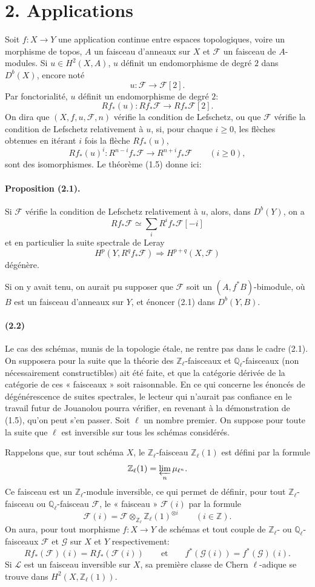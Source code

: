\documentclass[10pt]{article}
\newcommand{\Fcal}{\mathcal F}
\newcommand{\Gcal}{\mathcal G}
\newcommand{\Z}{\mathbb Z}
\newcommand{\Q}{\mathbb Q}
\begin{document}
\section*{2. Applications}

Soit $f:X\to Y$ une application continue entre espaces topologiques, voire un morphisme de topos, $A$ un faisceau d'anneaux sur $X$ et $\Fcal$ un faisceau de $A$-modules. Si $u\in H^2(X,A)$, $u$ définit un endomorphisme de degré $2$ dans $D^b(X)$, encore noté
\[
u:\Fcal\longrightarrow\Fcal[2].
\]
Par fonctorialité, $u$ définit un endomorphisme de degré $2$:
\[
Rf_*(u):Rf_*\Fcal\longrightarrow Rf_*\Fcal[2].
\]
On dira que $(X,f,u,\Fcal,n)$ vérifie la condition de Lefschetz, ou que $\Fcal$ vérifie la condition de Lefschetz relativement à $u$, si, pour chaque $i\ge0$, les flèches obtenues en itérant $i$ fois la flèche $Rf_*(u)$,
\[
Rf_*(u)^i:R^{n-i}f_*\Fcal\longrightarrow R^{n+i}f_*\Fcal\qquad(i\ge0),
\]
sont des isomorphismes. Le théorème (1.5) donne ici:

\paragraph{Proposition (2.1).} Si $\Fcal$ vérifie la condition de Lefschetz relativement à $u$, alors, dans $D^b(Y)$, on a
\[
Rf_*\Fcal\simeq\sum_iR^if_*\Fcal[-i]
\]
et en particulier la suite spectrale de Leray
\[
H^p(Y,R^qf_*\Fcal)\Longrightarrow H^{p+q}(X,\Fcal)
\]
dégénère.

Si on y avait tenu, on aurait pu supposer que $\Fcal$ soit un $(A,f^*B)$-bimodule, où $B$ est un faisceau d'anneaux sur $Y$, et énoncer (2.1) dans $D^b(Y,B)$.

\paragraph{(2.2)} Le cas des schémas, munis de la topologie étale, ne rentre pas dans le cadre (2.1). On supposera pour la suite que la théorie des $\Z_\ell$-faisceaux et $\Q_\ell$-faisceaux (non nécessairement constructibles) ait été faite, et que la catégorie dérivée de la catégorie de ces « faisceaux » soit raisonnable. En ce qui concerne les énoncés de dégénérescence de suites spectrales, le lecteur qui n'aurait pas confiance en le travail futur de Jouanolou pourra vérifier, en revenant à la démonstration de (1.5), qu'on peut s'en passer. Soit $\ell$ un nombre premier. On suppose pour toute la suite que $\ell$ est inversible sur tous les schémas considérés.

Rappelons que, sur tout schéma $X$, le $\Z_\ell$-faisceau $\Z_\ell(1)$ est défini par la formule
\[
\Z_\ell(1)=\varprojlim_n\mu_{\ell^n}.
\]
Ce faisceau est un $\Z_\ell$-module inversible, ce qui permet de définir, pour tout $\Z_\ell$-faisceau ou $\Q_\ell$-faisceau $\Fcal$, le « faisceau » $\Fcal(i)$ par la formule
\[
\Fcal(i)=\Fcal\otimes_{\Z_\ell}\Z_\ell(1)^{\otimes i}\qquad(i\in\Z).
\]
On aura, pour tout morphisme $f:X\to Y$ de schémas et tout couple de $\Z_\ell$- ou $\Q_\ell$-faisceaux $\Fcal$ et $\Gcal$ sur $X$ et $Y$ respectivement:
\[
\tag{2.3}
Rf_*(\Fcal)(i)=Rf_*(\Fcal(i))\qquad\text{et}\qquad f^*(\Gcal(i))=f^*(\Gcal)(i).
\]
Si $\mathcal L$ est un faisceau inversible sur $X$, sa première classe de Chern $\ell$-adique se trouve dans $H^2(X,\Z_\ell(1))$.
\end{document}
